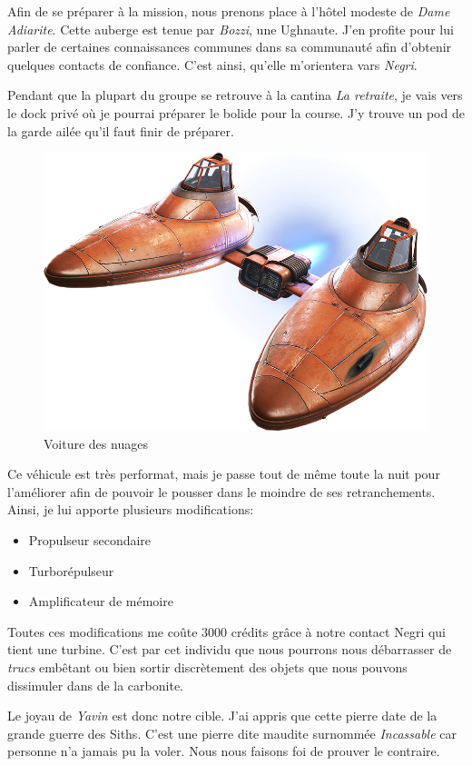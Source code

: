 \documentclass[a4paper,9pt,twoside,twocolumn,openany]{book}
\begin{document}
Afin de se préparer à la mission, nous prenons place à l'hôtel modeste de \emph{Dame Adiarite}. Cette auberge est tenue par \emph{Bozzi}, une Ughnaute. J'en profite pour lui parler de certaines connaissances communes dans sa communauté afin d'obtenir quelques contacts de confiance. C'est ainsi, qu'elle m'orientera vars \emph{Negri}.

Pendant que la plupart du groupe se retrouve à la cantina \emph{La retraite}, je vais vers le dock privé où je pourrai préparer le bolide pour la course. J'y trouve un pod de la garde ailée qu'il faut finir de préparer.

\begin{figure}[]
\centering
    \includegraphics[width=.80\textwidth]{img/cloud-car-v2.png}
    \caption{Voiture des nuages}
\end{figure}

Ce véhicule est très performat, mais je passe tout de même toute la nuit pour l'améliorer afin de pouvoir le pousser dans le moindre de ses retranchements. Ainsi, je lui apporte plusieurs modifications:

\begin{itemize}
\item Propulseur secondaire
\item Turborépulseur
\item Amplificateur de mémoire
\end{itemize}

Toutes ces modifications me coûte 3000 crédits grâce à notre contact Negri qui tient une turbine. C'est par cet individu que nous pourrons nous débarrasser de \emph{trucs} embêtant ou bien sortir discrètement des objets que nous pouvons dissimuler dans de la carbonite.

Le joyau de \emph{Yavin} est donc notre cible. J'ai appris que cette pierre date de la grande guerre des Siths. C'est une pierre dite maudite surnommée \emph{Incassable} car personne n'a jamais pu la voler. Nous nous faisons foi de prouver le contraire.
\end{document}
